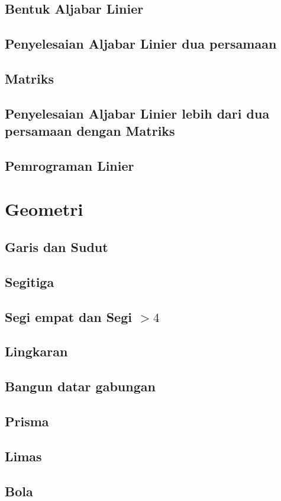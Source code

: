 \documentclass[12pt,a4paper,twoside,openany]{book}
\begin{document}
\section{Bentuk Aljabar Linier}
\section{Penyelesaian Aljabar Linier dua persamaan}
\section{Matriks}
\section{Penyelesaian Aljabar Linier lebih dari dua persamaan dengan Matriks}
\section{Pemrograman Linier}

\chapter{Geometri}
\section{Garis dan Sudut}
\section{Segitiga}
\section{Segi empat dan Segi $> 4$}
\section{Lingkaran}
\section{Bangun datar gabungan}

\section{Prisma}
\section{Limas}
\section{Bola}
\end{document}
